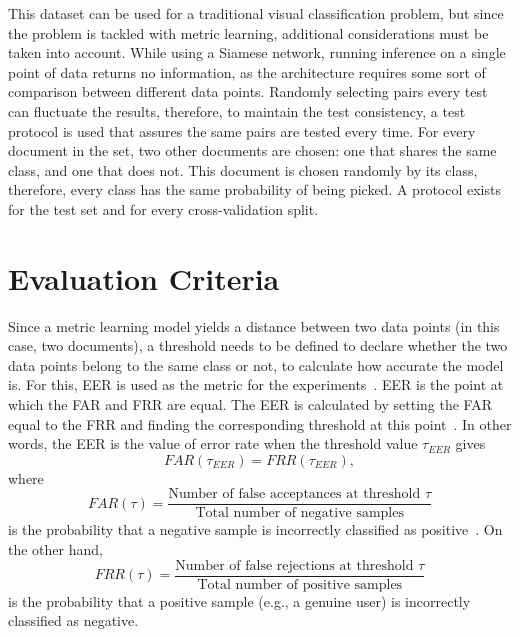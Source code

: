 This dataset can be used for a traditional visual classification problem, but since the problem is tackled with metric learning, additional considerations must be taken into account. While using a Siamese network, running inference on a single point of data returns no information, as the architecture requires some sort of comparison between different data points. Randomly selecting pairs every test can fluctuate the results, therefore, to maintain the test consistency, a test protocol is used that assures the same pairs are tested every time. For every document in the set, two other documents are chosen: one that shares the same class, and one that does not. This document is chosen randomly by its class, therefore, every class has the same probability of being picked. A protocol exists for the test set and for every cross-validation split.


\section{Evaluation Criteria}
\label{sec:evaluation}

Since a metric learning model yields a distance between two data points (in this case, two documents), a threshold needs to be defined to declare whether the two data points belong to the same class or not, to calculate how accurate the model is. For this, \gls{EER} is used as the metric for the experiments~\cite{EER}. \gls{EER} is  the point at which the \gls{FAR} and \gls{FRR} are equal. The \gls{EER} is calculated by setting the \gls{FAR} equal to the \gls{FRR} and finding the corresponding threshold at this point~\cite{EER2}. In other words, the \gls{EER} is the value of error rate when the threshold value $\tau_{EER}$ gives 
\begin{equation}
    FAR(\tau_{EER}) = FRR(\tau_{EER}),
\end{equation}
where
\begin{equation} \label{far}
    FAR(\tau) = \frac{\text{Number of false acceptances at threshold~} \tau}{\text{Total number of negative samples}}
\end{equation}
is the probability that a negative sample is incorrectly classified as positive~\cite{EER3}. On the other hand,
\begin{equation} \label{frr}
    FRR(\tau) = \frac{\text{Number of false rejections at threshold~} \tau}{\text{Total number of positive samples}}
\end{equation}
is the probability that a positive sample (e.g., a genuine user) is incorrectly classified as negative.

